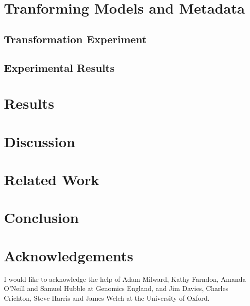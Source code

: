 \documentclass[runningheads]{llncs}
\begin{document}
	\section{Tranforming Models and Metadata}
	\subsection{Transformation Experiment}
	\subsection{Experimental Results}
	\section{Results}
	\section{Discussion}
	\section{Related Work}
	\section{Conclusion}
	
	
	
	\section{Acknowledgements}
	I would like to acknowledge the help of Adam Milward, Kathy Farndon, Amanda O'Neill and Samuel Hubble at Genomics England, and Jim Davies, Charles Crichton, Steve Harris and James Welch at the University of Oxford.
%	



	
	
\end{document}
